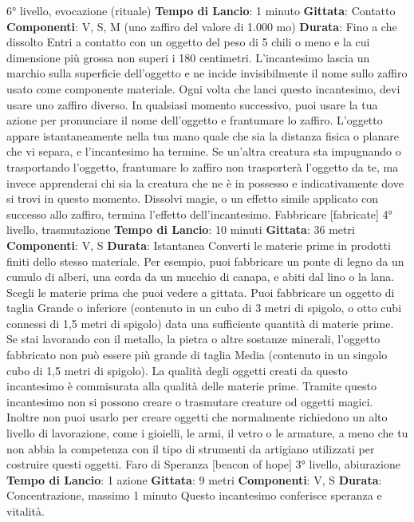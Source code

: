 \begin{multicols}{2}
6° livello, evocazione (rituale)
\textbf{Tempo di Lancio}: 1 minuto
\textbf{Gittata}: Contatto
\textbf{Componenti}: V, S, M (uno zaffiro del valore di 1.000
mo)
\textbf{Durata}: Fino a che dissolto
Entri a contatto con un oggetto del peso di 5 chili o
meno e la cui dimensione più grossa non superi i 180
centimetri. L’incantesimo lascia un marchio sulla
superficie dell’oggetto e ne incide invisibilmente il nome
sullo zaffiro usato come componente materiale. Ogni
volta che lanci questo incantesimo, devi usare uno
zaffiro diverso.
In qualsiasi momento successivo, puoi usare la tua
azione per pronunciare il nome dell’oggetto e
frantumare lo zaffiro. L’oggetto appare istantaneamente
nella tua mano quale che sia la distanza fisica o planare
che vi separa, e l’incantesimo ha termine.
Se un’altra creatura sta impugnando o trasportando
l’oggetto, frantumare lo zaffiro non trasporterà l’oggetto
da te, ma invece apprenderai chi sia la creatura che ne
è in possesso e indicativamente dove si trovi in questo
momento.
Dissolvi magie, o un effetto simile applicato con
successo allo zaffiro, termina l’effetto dell’incantesimo.
Fabbricare
[fabricate]
4° livello, trasmutazione
\textbf{Tempo di Lancio}: 10 minuti
\textbf{Gittata}: 36 metri
\textbf{Componenti}: V, S
\textbf{Durata}: Istantanea
Converti le materie prime in prodotti finiti dello stesso
materiale. Per esempio, puoi fabbricare un ponte di
legno da un cumulo di alberi, una corda da un mucchio
di canapa, e abiti dal lino o la lana.
Scegli le materie prima che puoi vedere a gittata. Puoi
fabbricare un oggetto di taglia Grande o inferiore
(contenuto in un cubo di 3 metri di spigolo, o otto cubi
connessi di 1,5 metri di spigolo) data una sufficiente
quantità di materie prime. Se stai lavorando con il
metallo, la pietra o altre sostanze minerali, l’oggetto
fabbricato non può essere più grande di taglia Media
(contenuto in un singolo cubo di 1,5 metri di spigolo). La
qualità degli oggetti creati da questo incantesimo è
commisurata alla qualità delle materie prime.
Tramite questo incantesimo non si possono creare o
trasmutare creature od oggetti magici. Inoltre non puoi
usarlo per creare oggetti che normalmente richiedono
un alto livello di lavorazione, come i gioielli, le armi, il
vetro o le armature, a meno che tu non abbia la
competenza con il tipo di strumenti da artigiano utilizzati
per costruire questi oggetti.
Faro di Speranza
[beacon of hope]
3° livello, abiurazione
\textbf{Tempo di Lancio}: 1 azione
\textbf{Gittata}: 9 metri
\textbf{Componenti}: V, S
\textbf{Durata}: Concentrazione, massimo 1 minuto
Questo incantesimo conferisce speranza e vitalità.

\end{multicols}
